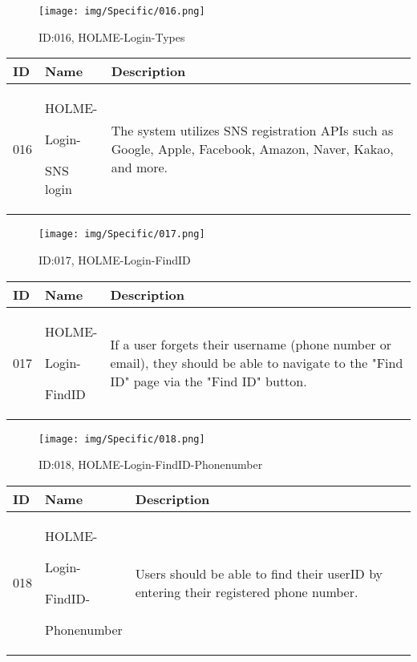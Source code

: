 \documentclass[conference]{IEEEtran}
\begin{document}
\begin{enumerate}
\begin{figure}[h]
\centering
\texttt{[image: img/Specific/016.png]}
\caption{ID:016, HOLME-Login-Types}
\end{figure}
\begin{table}[h]
\def\arraystretch{1.2} \small
    \begin{tabular}{|p{1cm}|p{1.8cm}|p{5.0cm}|}
        \hline
        ID & Name & Description\\ \hline
         016 \par  & HOLME-\par Login-\par SNS login &The system utilizes SNS registration APIs such as Google, Apple, Facebook, Amazon, Naver, Kakao, and more.\\ \hline
    \end{tabular}
\end{table}
\begin{figure}[h]
\centering
\texttt{[image: img/Specific/017.png]}
\caption{ID:017, HOLME-Login-FindID}
\end{figure}
\begin{table}[h]
\def\arraystretch{1.2} \small
    \begin{tabular}{|p{1cm}|p{1.8cm}|p{5.0cm}|}
        \hline
        ID & Name & Description\\ \hline
         017 \par  & HOLME-\par Login-\par FindID &If a user forgets their username (phone number or email), they should be able to navigate to the "Find ID" page via the "Find ID" button.\\ \hline
    \end{tabular}
\end{table}

\clearpage

\begin{figure}[h]
\centering
\texttt{[image: img/Specific/018.png]}
\caption{ID:018, HOLME-Login-FindID-Phonenumber}
\end{figure}
\begin{table}[h]
\def\arraystretch{1.2} \small
    \begin{tabular}{|p{1cm}|p{1.8cm}|p{5.0cm}|}
        \hline
        ID & Name & Description\\ \hline
         018 \par  & HOLME-\par Login-\par FindID- \par Phonenumber &Users should be able to find their userID by entering their registered phone number.\\ \hline
    \end{tabular}
\end{table}


\end{enumerate}
\end{document}
